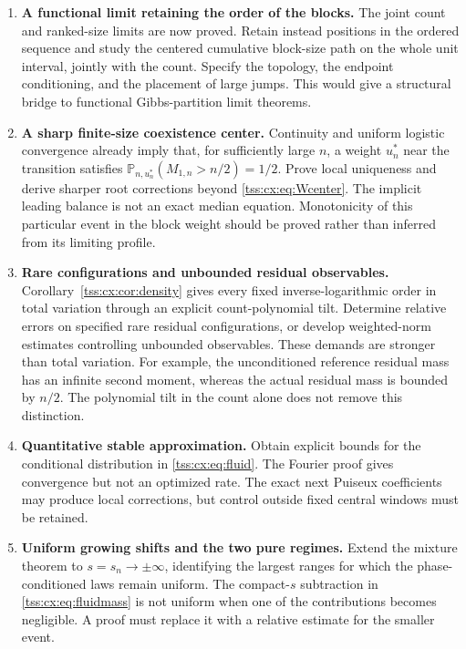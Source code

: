\documentclass[11pt]{article}
\theoremstyle{remark}\newtheorem{remark}[theorem]{Remark}
\theoremstyle{definition}\newtheorem{definition}[theorem]{Definition}
\newcommand{\Prob}{\mathbb P}
\begin{document}
\begin{enumerate}[label=\textbf{RQ\arabic*.},leftmargin=*]
\item \textbf{A functional limit retaining the order of the blocks.}
The joint count and ranked-size limits are now proved. Retain instead
positions in the ordered sequence and study the centered cumulative
block-size path on the whole unit interval, jointly with the count.
Specify the topology, the endpoint conditioning, and the placement
of large jumps. This would give a structural bridge to functional
Gibbs-partition limit theorems.

\item \textbf{A sharp finite-size coexistence center.}
Continuity and uniform logistic convergence already imply that,
for sufficiently large $n$, a weight $u_n^*$ near the transition
satisfies $\Prob_{n,u_n^*}(M_{1,n}>n/2)=1/2$.
Prove local uniqueness and derive sharper root corrections beyond
\eqref{tss:cx:eq:Wcenter}. The implicit leading balance is not an exact
median equation. Monotonicity of
this particular event in the block weight should be proved rather
than inferred from its limiting profile.

\item \textbf{Rare configurations and unbounded residual observables.}
Corollary~\ref{tss:cx:cor:density} gives every fixed inverse-logarithmic
order in total variation through an explicit count-polynomial tilt.
Determine relative errors on specified rare residual configurations,
or develop weighted-norm estimates controlling unbounded observables.
These demands are stronger than total variation. For example,
the unconditioned reference residual mass has an infinite second
moment, whereas the actual residual mass is bounded by $n/2$.
The polynomial tilt in the count alone does not remove this
distinction.

\item \textbf{Quantitative stable approximation.}
Obtain explicit bounds for the conditional distribution in
\eqref{tss:cx:eq:fluid}. The Fourier proof gives convergence but not an
optimized rate. The exact next Puiseux coefficients may produce
local corrections, but control outside fixed central windows must
be retained.

\item \textbf{Uniform growing shifts and the two pure regimes.}
Extend the mixture theorem to $s=s_n\to\pm\infty$, identifying the
largest ranges for which the phase-conditioned laws remain uniform.
The compact-$s$ subtraction in \eqref{tss:cx:eq:fluidmass} is not uniform
when one of the contributions becomes negligible. A proof must
replace it with a relative estimate for the smaller event.


\end{enumerate}
\end{document}
